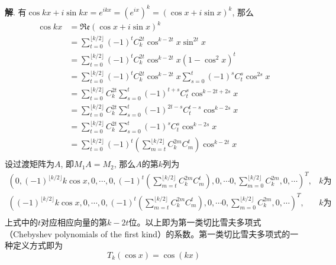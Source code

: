 {\bf 解}. 有$\cos kx + i\sin kx = e^{ikx} = \left( e^{ix} \right)^k = \left( \cos x + i\sin x \right)^k$, 那么
\begin{align*}
\cos kx & = \mathfrak{R}\mathfrak{e}\left( \cos x + i\sin x \right)^k \\
& = \sum_{t=0}^{\lfloor k/2 \rfloor} (-1)^t C_k^{2t} \cos^{k-2t} x \sin^{2t} x \\
& = \sum_{t=0}^{\lfloor k/2 \rfloor} (-1)^t C_k^{2t} \cos^{k-2t} x (1-\cos^2x)^t \\
& = \sum_{t=0}^{\lfloor k/2 \rfloor} (-1)^t C_k^{2t} \cos^{k-2t} x \sum_{s=0}^t (-1)^s C_t^s \cos^{2s} x \\
& = \sum_{t=0}^{\lfloor k/2 \rfloor} C_k^{2t} \sum_{s=0}^t (-1)^{t+s} C_t^s \cos^{k-2t+2s} x \\
& = \sum_{t=0}^{\lfloor k/2 \rfloor} C_k^{2t} \sum_{s=0}^t (-1)^{2t-s} C_t^{t-s} \cos^{k-2s} x \\
& = \sum_{t=0}^{\lfloor k/2 \rfloor} C_k^{2t} \sum_{s=0}^t (-1)^s C_t^s \cos^{k-2s} x \\
& = \sum_{t=0}^{\lfloor k/2 \rfloor} (-1)^t \left(\sum_{m=t}^{\lfloor k/2 \rfloor}  C_k^{2m} C_m^t \right) \cos^{k-2t} x \\
\end{align*}
设过渡矩阵为$A$, 即$M_1A = M_2$, 那么$A$的第$k$列为
\begin{align*}
\left(0, (-1)^{\lfloor k/2 \rfloor} k\cos x, 0, \cdots, 0, (-1)^t \left(\sum_{m=t}^{\lfloor k/2 \rfloor}  C_k^{2m} C_m^t \right), 0, \cdots 0, \sum_{m=0}^{\lfloor k/2 \rfloor}  C_k^{2m}, 0, \cdots \right)^T, & \text{$k$为奇数} \\
\left((-1)^{\lfloor k/2 \rfloor} k\cos x, 0, \cdots, 0, (-1)^t \left(\sum_{m=t}^{\lfloor k/2 \rfloor}  C_k^{2m} C_m^t \right), 0, \cdots 0, \sum_{m=0}^{\lfloor k/2 \rfloor}  C_k^{2m}, 0, \cdots \right)^T, & \text{$k$为偶数} \\
\end{align*}
上式中的$t$对应相应向量的第$k-2t$位。以上即为第一类切比雪夫多项式（Chebyshev polynomials of the first kind）的系数。第一类切比雪夫多项式的一种定义方式即为
$$T_k(\cos x) = \cos (kx)$$



